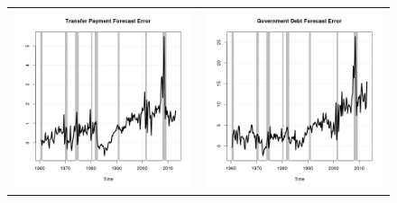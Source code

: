 \documentclass[11pt]{article}
\begin{document}
\begin{figure}
\begin{center}
\begin{tabular}{cc}
\includegraphics[scale=0.45]{./results/pics0.02/fe_transfers.png} & \includegraphics[scale=0.45]{./results/pics0.02/fe_debt.png}  
\end{tabular}
\end{center}
\end{figure} 
\end{document}
